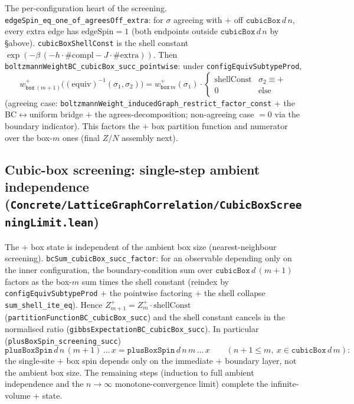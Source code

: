 \documentclass[a4paper,11pt]{article}
\begin{document}
The per-configuration heart of the screening.
\texttt{edgeSpin\_eq\_one\_of\_agreesOff\_extra}: for $\sigma$ agreeing with $+$ off
$\texttt{cubicBox}\,d\,n$, every extra edge has $\mathrm{edgeSpin} = 1$ (both
endpoints outside $\texttt{cubicBox}\,d\,n$ by \S above). \texttt{cubicBoxShellConst}
is the shell constant
$\exp(-\beta\,(-h\cdot\#\mathrm{compl} - J\cdot\#\mathrm{extra}))$. Then
\texttt{boltzmannWeightBC\_cubicBox\_succ\_pointwise}: under
\texttt{configEquivSubtypeProd},
\[
  w^{+}_{\texttt{box}\,(m+1)}\big((\mathrm{equiv})^{-1}(\sigma_1,\sigma_2)\big)
    = w^{+}_{\texttt{box}\,m}(\sigma_1) \cdot
      \begin{cases} \mathrm{shellConst} & \sigma_2 \equiv +\\ 0 & \text{else}
      \end{cases}
\]
(agreeing case: \texttt{boltzmannWeight\_inducedGraph\_restrict\_factor\_const} $+$
the BC$\leftrightarrow$uniform bridge $+$ the agrees-decomposition; non-agreeing
case $= 0$ via the boundary indicator). This factors the $+$ box partition function
and numerator over the box-$m$ ones (final $Z/N$ assembly next).

\subsection{Cubic-box screening: single-step ambient independence
(\texttt{Concrete/LatticeGraphCorrelation/CubicBoxScreeningLimit.lean})}

The $+$ box state is independent of the ambient box size (nearest-neighbour
screening). \texttt{bcSum\_cubicBox\_succ\_factor}: for an observable depending only
on the inner configuration, the boundary-condition sum over
$\texttt{cubicBox}\,d\,(m+1)$ factors as the box-$m$ sum times the shell constant
(reindex by \texttt{configEquivSubtypeProd} $+$ the pointwise factoring $+$ the
shell collapse \texttt{sum\_shell\_ite\_eq}). Hence
$Z^{+}_{m+1} = Z^{+}_m \cdot \mathrm{shellConst}$
(\texttt{partitionFunctionBC\_cubicBox\_succ}) and the shell constant cancels in the
normalised ratio (\texttt{gibbsExpectationBC\_cubicBox\_succ}). In particular
(\texttt{plusBoxSpin\_screening\_succ})
\[
  \texttt{plusBoxSpin}\,d\,n\,(m+1)\,\dots\,x
    = \texttt{plusBoxSpin}\,d\,n\,m\,\dots\,x
  \qquad (n+1 \le m,\ x \in \texttt{cubicBox}\,d\,m):
\]
the single-site $+$ box spin depends only on the immediate $+$ boundary layer, not
the ambient box size. The remaining steps (induction to full ambient independence
and the $n \to \infty$ monotone-convergence limit) complete the infinite-volume $+$
state.
\end{document}
